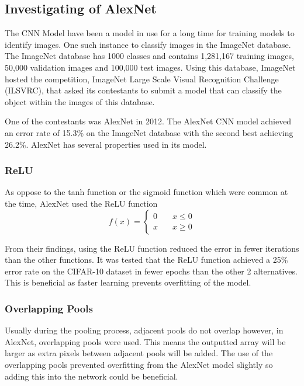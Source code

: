 \documentclass[../main.tex]{subfiles}
\begin{document}
\subsection{Investigating of AlexNet}

The CNN Model have been a model in use for a long time for training models to identify images. One such instance to classify images in the ImageNet database. The ImageNet database has 1000 classes and contains 1,281,167 training images, 50,000 validation images and 100,000 test images. Using this database, ImageNet hosted the competition, ImageNet Large Scale Visual Recognition Challenge (ILSVRC), that asked its contestants to submit a model that can classify the object within the images of this database.  \cite{ILSVRC15}

One of the contestants was AlexNet in 2012. The AlexNet CNN model achieved an error rate of 15.3\% on the ImageNet database with the second best achieving 26.2\%. AlexNet has several properties used in its model.  \cite{alexnet}

\subsubsection{ReLU}
As oppose to the tanh function or the sigmoid function which were common at the time, AlexNet used the ReLU function \begin{equation*}
f(x) = \left\{
        \begin{array}{ll}
            0 & \quad x \leq 0 \\
            x & \quad x \geq 0
        \end{array}
    \right.
\end{equation*}

From their findings, using the ReLU function reduced the error in fewer iterations than the other functions. It was tested that the ReLU function achieved a 25\% error rate on the CIFAR-10 dataset in fewer epochs than the other 2 alternatives. This is beneficial as faster learning prevents overfitting of the model. \cite{alexnet}

\subsubsection{Overlapping Pools}
Usually during the pooling process, adjacent pools do not overlap however, in AlexNet, overlapping pools were used. This means the outputted array will be larger as extra pixels between adjacent pools will be added. The use of the overlapping pools prevented overfitting from the AlexNet model slightly so adding this into the network could be beneficial.  \cite{alexnet}
\end{document}
